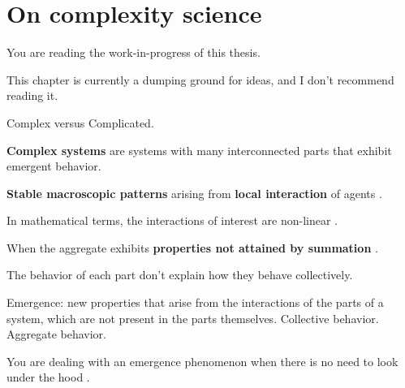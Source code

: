 \documentclass[
12pt,
openright,
oneside,
a4paper,
chapter=TITLE,
section=TITLE,
french,
spanish,
brazil,
english
]{abntex2}\usepackage{array}
\newcommand{\microskip}{\vspace{\microskipamount}}
\begin{document}

\chapter{On complexity science}\label{on-complexity-science}

\begin{tcolorbox}[enhanced jigsaw, coltitle=black, opacitybacktitle=0.6, colframe=quarto-callout-important-color-frame, arc=.35mm, colbacktitle=quarto-callout-important-color!10!white, titlerule=0mm, title=\textcolor{quarto-callout-important-color}{\faExclamation}\hspace{0.5em}{Important}, breakable, bottomrule=.15mm, rightrule=.15mm, bottomtitle=1mm, left=2mm, opacityback=0, toprule=.15mm, leftrule=.75mm, toptitle=1mm, colback=white]

You are reading the work-in-progress of this thesis.

\microskip

This chapter is currently a dumping ground for ideas, and I don't
recommend reading it.

\end{tcolorbox}

Complex versus Complicated.

\textbf{Complex systems} are systems with many interconnected parts that
exhibit emergent behavior.

\textbf{Stable macroscopic patterns} arising from \textbf{local
interaction} of agents \autocite{epstein1999}.

In mathematical terms, the interactions of interest are non-linear
\autocite{holland2014}.

When the aggregate exhibits \textbf{properties not attained by
summation} \autocite{holland2014}.

The behavior of each part don't explain how they behave collectively.

Emergence: new properties that arise from the interactions of the parts
of a system, which are not present in the parts themselves. Collective
behavior. Aggregate behavior.

You are dealing with an emergence phenomenon when there is no need to
look under the hood \autocite{krakauer2023}.
\end{document}
